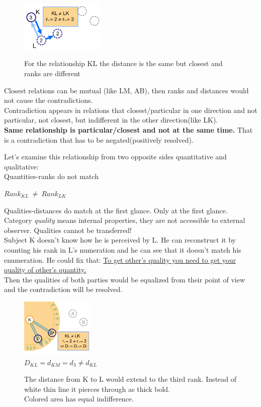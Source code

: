 \documentclass[12pt, a4paper, twocolumn]{article}
\newcommand{\githubPics}{https://raw.githubusercontent.com/artamono/druhg/master/papers/druhg/}
\begin{document}
\begin{figure}[H]
  \centering
  \href{\githubPics Count_3.png}{\includegraphics[width=4cm]{Count_3.png}}
  \centering
  \caption{For the relationship KL the distance is the same but closest and ranks are different}
\end{figure}

Closest relations can be mutual (like LM, AB), then ranks and distances would not cause the contradictions.
\\ Contradiction appears in relations that closest/particular in one direction and not particular, not closest, but indifferent in the other direction(like LK).
\\ \textbf{Same relationship is particular/closest and not at the same time.} That is a contradiction that has to be negated(positively resolved).

Let's examine this relationship from two opposite sides quantitative and qualitative: \\Quantities-ranks do not match 
\vspace{\myvspace}

\centerline{$Rank_{KL}~\neq~Rank_{LK}$}
Qualities-distances do match at the first glance. Only at the first glance. Category \textit{quality} means internal properties, they are not accessible to external observer. Qualities cannot be transferred!
\\ Subject K doesn't know how he is perceived by L. He can reconstruct it by counting his rank in L's numeration and he can see that it doesn't match his enumeration. He could fix that: \ul{To get other's quality you need to get your quality of other's quantity.}
\\ Then the qualities of both parties would be equalized from their point of view and the contradiction will be resolved.

\begin{figure}[H]
  \centering
  \includegraphics[width=3.5cm]{Increased.png}  
  \\ $ D_{KL} = d_{KM} = d_{3} \neq d_{KL} $
  \caption{The distance from K to L would extend to the third rank. Instead of white thin line it pierces through as thick bold.
  \\ Colored area has equal indifference.}
\end{figure}
\end{document}
